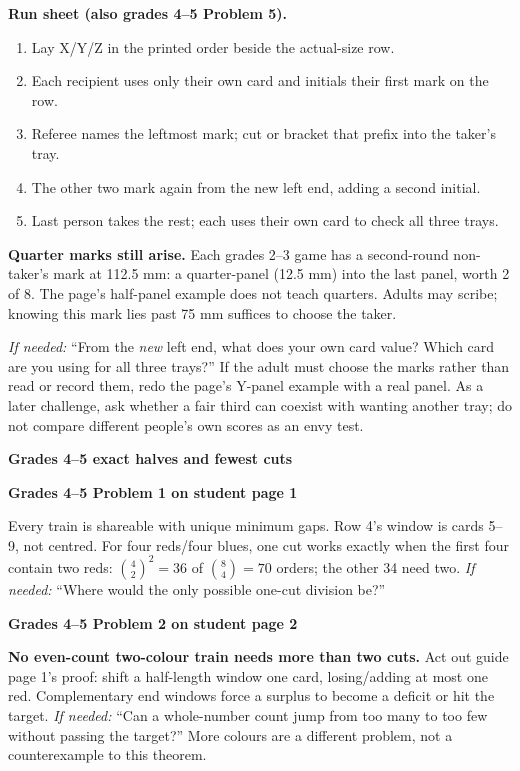 \documentclass[11pt]{article}
\newcommand{\head}[1]{\par\textbf{\large #1}\par}
\newcommand{\sub}[1]{\par\textbf{#1}\par}
\newcommand{\hint}[1]{\textit{If needed:} #1}
\begin{document}
\textbf{Run sheet (also grades 4--5 Problem 5).}
\begin{enumerate}\setlength{\itemsep}{0pt}\setlength{\parskip}{0pt}
\item Lay X/Y/Z in the printed order beside the actual-size row.
\item Each recipient uses only their own card and initials their first mark on the row.
\item Referee names the leftmost mark; cut or bracket that prefix into the taker's tray.
\item The other two mark again from the new left end, adding a second initial.
\item Last person takes the rest; each uses their own card to check all three trays.
\end{enumerate}
\textbf{Quarter marks still arise.} Each grades 2--3 game has a second-round non-taker's mark at 112.5 mm: a quarter-panel (12.5 mm) into the last panel, worth 2 of 8. The page's half-panel example does not teach quarters. Adults may scribe; knowing this mark lies past 75 mm suffices to choose the taker.

\hint{``From the \emph{new} left end, what does your own card value? Which card are you using for all three trays?''} If the adult must choose the marks rather than read or record them, redo the page's Y-panel example with a real panel. As a later challenge, ask whether a fair third can coexist with wanting another tray; do not compare different people's own scores as an envy test.
\newpage
\head{Grades 4--5 exact halves and fewest cuts}
\sub{Grades 4--5 Problem 1 on student page 1}
\begin{center}\utable\end{center}
Every train is shareable with unique minimum gaps. Row 4's window is cards 5--9, not centred. For four reds/four blues, one cut works exactly when the first four contain two reds: $\binom42^2=36$ of $\binom84=70$ orders; the other 34 need two. \hint{``Where would the only possible one-cut division be?''}

\sub{Grades 4--5 Problem 2 on student page 2}
\textbf{No even-count two-colour train needs more than two cuts.} Act out guide page 1's proof: shift a half-length window one card, losing/adding at most one red. Complementary end windows force a surplus to become a deficit or hit the target. \hint{``Can a whole-number count jump from too many to too few without passing the target?''} More colours are a different problem, not a counterexample to this theorem.
\end{document}
